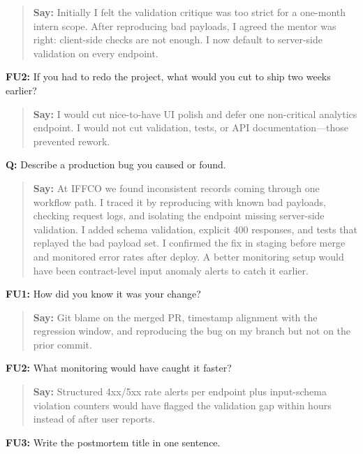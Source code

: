 \documentclass[9pt,a4paper]{article}
\begin{document}
\begin{quote}\small\textbf{Say:} Initially I felt the validation critique was too strict for a one-month intern scope. After reproducing bad payloads, I agreed the mentor was right: client-side checks are not enough. I now default to server-side validation on every endpoint.\end{quote}
\vspace{2mm}
\textbf{FU2:} If you had to redo the project, what would you cut to ship two weeks earlier?

\begin{quote}\small\textbf{Say:} I would cut nice-to-have UI polish and defer one non-critical analytics endpoint. I would not cut validation, tests, or API documentation---those prevented rework.\end{quote}
\vspace{2mm}
\textbf{Q:} Describe a production bug you caused or found.

\begin{quote}\small\textbf{Say:} At IFFCO we found inconsistent records coming through one workflow path. I traced it by reproducing with known bad payloads, checking request logs, and isolating the endpoint missing server-side validation. I added schema validation, explicit 400 responses, and tests that replayed the bad payload set. I confirmed the fix in staging before merge and monitored error rates after deploy. A better monitoring setup would have been contract-level input anomaly alerts to catch it earlier.\end{quote}
\vspace{2mm}
\textbf{FU1:} How did you know it was your change?

\begin{quote}\small\textbf{Say:} Git blame on the merged PR, timestamp alignment with the regression window, and reproducing the bug on my branch but not on the prior commit.\end{quote}
\vspace{2mm}
\textbf{FU2:} What monitoring would have caught it faster?

\begin{quote}\small\textbf{Say:} Structured 4xx/5xx rate alerts per endpoint plus input-schema violation counters would have flagged the validation gap within hours instead of after user reports.\end{quote}
\vspace{2mm}
\textbf{FU3:} Write the postmortem title in one sentence.
\end{document}
